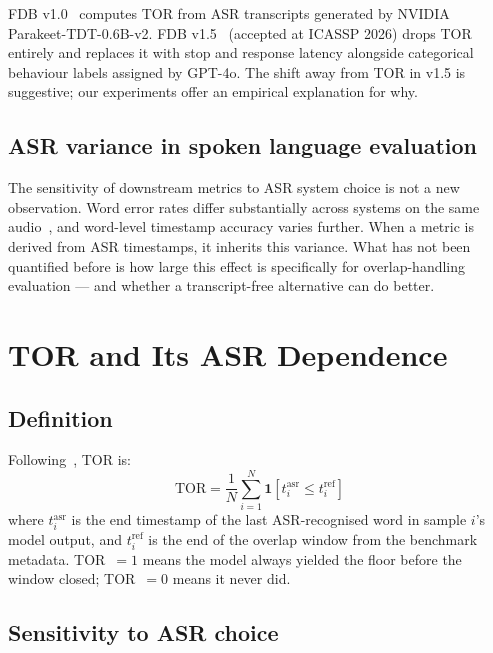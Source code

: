 \documentclass[a4paper]{article}
\begin{document}
FDB v1.0~\cite{lin2025fullduplex} computes TOR from ASR transcripts generated
by NVIDIA Parakeet-TDT-0.6B-v2. FDB v1.5~\cite{lin2025fullduplexv15}
(accepted at ICASSP 2026) drops TOR entirely and replaces it with stop and
response latency alongside categorical behaviour labels assigned by GPT-4o.
The shift away from TOR in v1.5 is suggestive; our experiments offer an
empirical explanation for why.

\subsection{ASR variance in spoken language evaluation}

The sensitivity of downstream metrics to ASR system choice is not a new
observation. Word error rates differ substantially across systems on the same
audio~\cite{radford2023whisper}, and word-level timestamp accuracy varies
further. When a metric is derived from ASR timestamps, it inherits this
variance. What has not been quantified before is how large this effect is
specifically for overlap-handling evaluation --- and whether a transcript-free
alternative can do better.

\section{TOR and Its ASR Dependence}
\label{sec:tor}

\subsection{Definition}

Following~\cite{lin2025fullduplex}, TOR is:
\begin{equation}
    \text{TOR} = \frac{1}{N} \sum_{i=1}^{N}
    \mathbf{1}\!\left[t^{\text{asr}}_i \leq t^{\text{ref}}_i\right]
    \label{eq:tor}
\end{equation}
where $t^{\text{asr}}_i$ is the end timestamp of the last ASR-recognised word
in sample $i$'s model output, and $t^{\text{ref}}_i$ is the end of the overlap
window from the benchmark metadata. TOR~$= 1$ means the model always yielded
the floor before the window closed; TOR~$= 0$ means it never did.

\subsection{Sensitivity to ASR choice}
\end{document}
